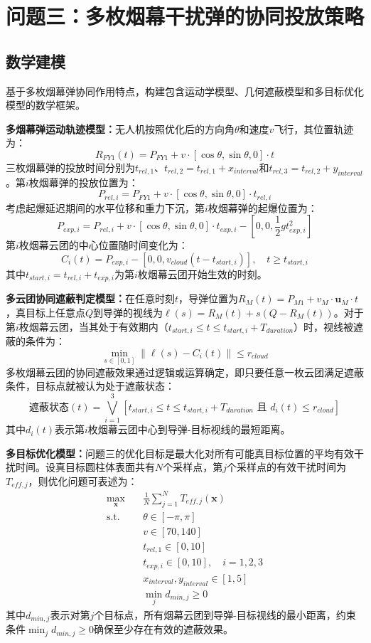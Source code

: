 \section{问题三：多枚烟幕干扰弹的协同投放策略}

\subsection{数学建模}

基于多枚烟幕弹协同作用特点，构建包含运动学模型、几何遮蔽模型和多目标优化模型的数学框架。

\textbf{多烟幕弹运动轨迹模型：}无人机按照优化后的方向角$\theta$和速度$v$飞行，其位置轨迹为：
\[
R_{FY1}(t) = P_{FY1} + v \cdot [\cos\theta, \sin\theta, 0] \cdot t
\]
三枚烟幕弹的投放时间分别为$t_{rel,1}$、$t_{rel,2} = t_{rel,1} + x_{interval}$和$t_{rel,3} = t_{rel,2} + y_{interval}$。第$i$枚烟幕弹的投放位置为：
\[
P_{rel,i} = P_{FY1} + v \cdot [\cos\theta, \sin\theta, 0] \cdot t_{rel,i}
\]
考虑起爆延迟期间的水平位移和重力下沉，第$i$枚烟幕弹的起爆位置为：
\[
P_{exp,i} = P_{rel,i} + v \cdot [\cos\theta, \sin\theta, 0] \cdot t_{exp,i} - [0, 0, \frac{1}{2}gt_{exp,i}^2]
\]
第$i$枚烟幕云团的中心位置随时间变化为：
\[
C_i(t) = P_{exp,i} - [0, 0, v_{cloud}(t - t_{start,i})], \quad t \geq t_{start,i}
\]
其中$t_{start,i} = t_{rel,i} + t_{exp,i}$为第$i$枚烟幕云团开始生效的时刻。

\textbf{多云团协同遮蔽判定模型：}在任意时刻$t$，导弹位置为$R_M(t) = P_{M1} + v_M \cdot \mathbf{u}_M \cdot t$，真目标上任意点$Q$到导弹的视线为$\ell(s) = R_M(t) + s(Q - R_M(t))$。对于第$i$枚烟幕云团，当其处于有效期内（$t_{start,i} \leq t \leq t_{start,i} + T_{duration}$）时，视线被遮蔽的条件为：
\[
\min_{s \in [0,1]} \|\ell(s) - C_i(t)\| \leq r_{cloud}
\]
多枚烟幕云团的协同遮蔽效果通过逻辑或运算确定，即只要任意一枚云团满足遮蔽条件，目标点就被认为处于遮蔽状态：
\[
\text{遮蔽状态}(t) = \bigvee_{i=1}^{3} \left[ t_{start,i} \leq t \leq t_{start,i} + T_{duration} \text{ 且 } d_i(t) \leq r_{cloud} \right]
\]
其中$d_i(t)$表示第$i$枚烟幕云团中心到导弹-目标视线的最短距离。

\textbf{多目标优化模型：}问题三的优化目标是最大化对所有可能真目标位置的平均有效干扰时间。设真目标圆柱体表面共有$N$个采样点，第$j$个采样点的有效干扰时间为$T_{eff,j}$，则优化问题可表述为：
\[
\begin{aligned}
\max_{\mathbf{x}} \quad & \frac{1}{N} \sum_{j=1}^{N} T_{eff,j}(\mathbf{x}) \\
\text{s.t.} \quad & \theta \in [-\pi, \pi] \\
& v \in [70, 140] \\
& t_{rel,1} \in [0, 10] \\
& t_{exp,i} \in [0, 10], \quad i = 1,2,3 \\
& x_{interval}, y_{interval} \in [1, 5] \\
& \min_j d_{min,j} \geq 0
\end{aligned}
\]
其中$d_{min,j}$表示对第$j$个目标点，所有烟幕云团到导弹-目标视线的最小距离，约束条件$\min_j d_{min,j} \geq 0$确保至少存在有效的遮蔽效果。

